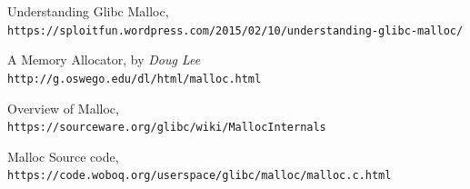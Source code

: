 \documentclass{article}
\begin{document}
\begin{thebibliography}{4}
  
Understanding Glibc Malloc,
\\\texttt{https://sploitfun.wordpress.com/2015/02/10/understanding-glibc-malloc/}

A Memory Allocator, by \textit{Doug Lee}
\\\texttt{http://g.oswego.edu/dl/html/malloc.html}


Overview of Malloc,
\\\texttt{https://sourceware.org/glibc/wiki/MallocInternals}

Malloc Source code,
\\\texttt{https://code.woboq.org/userspace/glibc/malloc/malloc.c.html}

\end{thebibliography}
\end{document}
